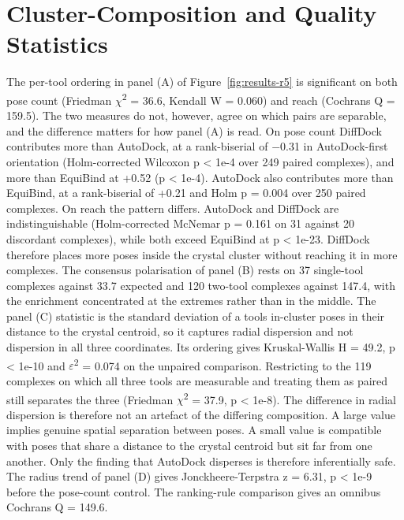 \hypertarget{cluster-composition-statistics}{%
\section{Cluster-Composition and Quality Statistics}\label{cluster-composition-statistics}}

The per-tool ordering in panel (A) of Figure~\ref{fig:results-r5} is significant on both pose count (Friedman \ensuremath{\chi}\textsuperscript{2} = 36.6, Kendall W = 0.060) and reach (Cochran\textquotesingle s Q = 159.5). The two measures do not, however, agree on which pairs are separable, and the difference matters for how panel (A) is read. On pose count DiffDock contributes more than AutoDock, at a rank-biserial of \ensuremath{-}0.31 in AutoDock-first orientation (Holm-corrected Wilcoxon p \textless{} 1e-4 over 249 paired complexes), and more than EquiBind at +0.52 (p \textless{} 1e-4). AutoDock also contributes more than EquiBind, at a rank-biserial of +0.21 and Holm p = 0.004 over 250 paired complexes. On reach the pattern differs. AutoDock and DiffDock are indistinguishable (Holm-corrected McNemar p = 0.161 on 31 against 20 discordant complexes), while both exceed EquiBind at p \textless{} 1e-23. DiffDock therefore places more poses inside the crystal cluster without reaching it in more complexes. The consensus polarisation of panel (B) rests on 37 single-tool complexes against 33.7 expected and 120 two-tool complexes against 147.4, with the enrichment concentrated at the extremes rather than in the middle. The panel (C) statistic is the standard deviation of a tool\textquotesingle s in-cluster poses in their distance to the crystal centroid, so it captures radial dispersion and not dispersion in all three coordinates. Its ordering gives Kruskal-Wallis H = 49.2, p \textless{} 1e-10 and \ensuremath{\varepsilon}\textsuperscript{2} = 0.074 on the unpaired comparison. Restricting to the 119 complexes on which all three tools are measurable and treating them as paired still separates the three (Friedman \ensuremath{\chi}\textsuperscript{2} = 37.9, p \textless{} 1e-8). The difference in radial dispersion is therefore not an artefact of the differing composition. A large value implies genuine spatial separation between poses. A small value is compatible with poses that share a distance to the crystal centroid but sit far from one another. Only the finding that AutoDock disperses is therefore inferentially safe. The radius trend of panel (D) gives Jonckheere-Terpstra z = 6.31, p \textless{} 1e-9 before the pose-count control. The ranking-rule comparison gives an omnibus Cochran\textquotesingle s Q = 149.6.


